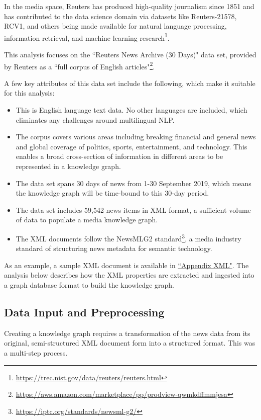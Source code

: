 \documentclass[11pt]{article}
\begin{document}
In the media space, Reuters has produced high-quality journalism since 1851 and has contributed to the data science domain via datasets like Reuters-21578\cite{reuters-21578}, RCV1\cite{lewis2004rcv1}, and others\cite{reuters-corpora} being made available for natural language processing, information retrieval, and machine learning research\footnote{\url{https://trec.nist.gov/data/reuters/reuters.html}}.

This analysis focuses on the ``Reuters News Archive (30 Days)" data set, provided by Reuters as a ``full corpus of English articles"\footnote{\url{https://aws.amazon.com/marketplace/pp/prodview-qwmkdffmmjesa}}.

A few key attributes of this data set include the following, which make it suitable for this analysis:
\begin{itemize}
  \item{This is English language text data. No other languages are included, which eliminates any challenges around multilingual NLP.}
  \item{The corpus covers various areas including breaking financial and general news and global coverage of politics, sports, entertainment, and technology. This enables a broad cross-section of information in different areas to be represented in a knowledge graph.}
  \item{The data set spans 30 days of news from 1-30 September 2019, which means the knowledge graph will be time-bound to this 30-day period.}
  \item{The data set includes 59,542 news items in XML format, a sufficient volume of data to populate a media knowledge graph.}
  \item{The XML documents follow the NewsMLG2 standard\footnote{\url{https://iptc.org/standards/newsml-g2/}}, a media industry standard of structuring news metadata for semantic technology.}
\end{itemize}

As an example, a sample XML document is available in \hyperref[sec:AppendixXML]{``Appendix XML"}. The analysis below describes how the XML properties are extracted and ingested into a graph database format to build the knowledge graph.

\subsection{Data Input and Preprocessing}
Creating a knowledge graph requires a transformation of the news data from its original, semi-structured XML document form into a structured format. This was a multi-step process.
\end{document}
